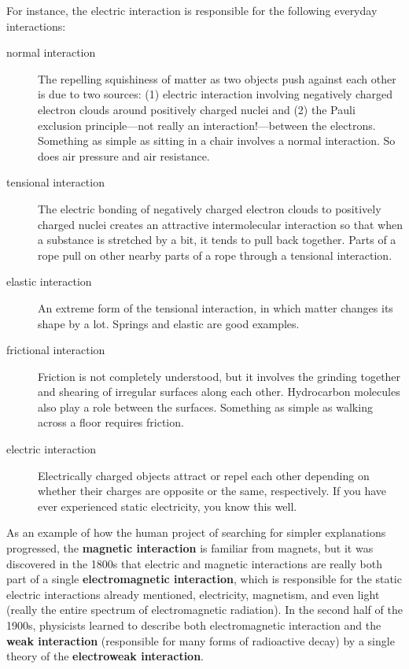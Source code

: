 \documentclass[12pt,twocolumn]{article}
\begin{document}
For instance, the electric interaction is responsible for the following everyday interactions:
\begin{description}
\item[normal interaction]The repelling squishiness of matter as two objects push against each other is due to two sources: (1) electric interaction involving negatively charged electron clouds around positively charged nuclei and (2) the Pauli exclusion principle---not really an interaction!---between the electrons.  Something as simple as sitting in a chair involves a normal interaction.  So does air pressure and air resistance.
\item[tensional interaction]The electric bonding of negatively charged electron clouds to positively charged nuclei creates an attractive intermolecular interaction so that when a substance is stretched by a bit, it tends to pull back together.  Parts of a rope pull on other nearby parts of a rope through a tensional interaction.
\item[elastic interaction]An extreme form of the tensional interaction, in which matter changes its shape by a lot.  Springs and elastic are good examples.
\item[frictional interaction]Friction is not completely understood, but it involves the grinding together and shearing of irregular surfaces along each other.  Hydrocarbon molecules also play a role between the surfaces.  Something as simple as walking across a floor requires friction.
\item[electric interaction]Electrically charged objects attract or repel each other depending on whether their charges are opposite or the same, respectively.  If you have ever experienced static electricity, you know this well.
\end{description}
As an example of how the human project of searching for simpler explanations progressed, the \textbf{magnetic interaction} is familiar from magnets, but it was discovered in the 1800s that electric and magnetic interactions are really both part of a single \textbf{electromagnetic interaction}, which is responsible for the static electric interactions already mentioned, electricity, magnetism, and even light (really the entire spectrum of electromagnetic radiation).  In the second half of the 1900s, physicists learned to describe both electromagnetic interaction and the \textbf{weak interaction} (responsible for many forms of radioactive decay) by a single theory of the \textbf{electroweak interaction}.
\end{document}
